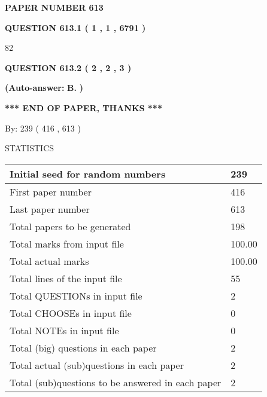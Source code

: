 \documentclass{ctexart}
\begin{document}
   
\newpage 
\setcounter{page}{ 
   613001 } 
   
   
 {\textbf{ \Large{ PAPER NUMBER  613  }}}
   
   
   
   
  
  
{\textbf{\large{QUESTION
613.1 
 ( 1 , 1 , 6791 )
}}}

82
  
  
{\textbf{\large{QUESTION
613.2 
 ( 2 , 2 , 3 )
}}}
 
 
{\textbf{(Auto-answer:}}
{\textbf{\large{
B.}}}
{\textbf{)}}
 
 
   
   
   
   
\vspace{1.0in} 
{\textbf{\large{ *** END OF PAPER, THANKS *** }}} 
   
   
\hspace{1.0in} By: 
 239 ( 416 ,  613 )
   
   
   
\vspace{0.2in}
\vspace{0.2in}
   
   
 \newpage
\setcounter{page}{1} 
   
   
 {\LARGE{STATISTICS}}
   
\vspace{0.2in}
   
 \begin{tabular}{|l|l|}
 \hline
 Initial seed for random numbers & 239  \\
\hline
 First paper number & 416  \\
\hline
 Last  paper number & 613  \\
\hline
 Total papers to be generated & 198  \\
\hline
Total marks from input file & 100.00 \\
\hline
Total actual marks & 100.00 \\
\hline
 Total lines of the input file & 55  \\
 \hline
 Total QUESTIONs in input file & 2  \\
\hline
 Total CHOOSEs in input file & 0  \\
\hline
 Total NOTEs in input file & 0  \\
\hline
 Total (big) questions in each paper & 2  \\
\hline
 Total actual (sub)questions in each paper & 2  \\
\hline
 Total (sub)questions to be answered in each paper & 2  \\
\hline
 \end{tabular}
   
\end{document}
